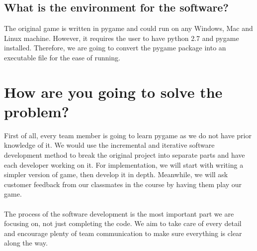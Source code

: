 \documentclass[12pt]{article}
\begin{document}
    \subsection {What is the environment for the software?}
    The original game is written in pygame and could run on any Windows, Mac and Linux machine. However, it requires the user to have python 2.7 and pygame installed. Therefore, we are going to convert the pygame package into an executable file for the ease of running.

\section{How are you going to solve the problem?}
First of all, every team member is going to learn pygame as we do not have prior knowledge of it. We would use the incremental and iterative software development method to break the original project into separate parts and have each developer working on it. For implementation, we will start with writing a simpler version of game, then develop it in depth. Meanwhile, we will ask customer feedback from our classmates in the course by having them play our game.\\\\The process of the software development is the most important part we are focusing on, not just completing the code. We aim to take care of every detail and encourage plenty of team communication to make sure everything is clear along the way.
\end{document}
